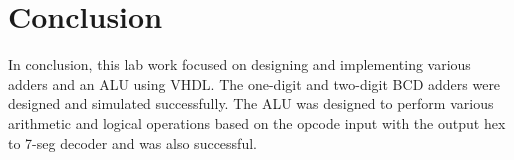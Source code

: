 \documentclass[a4paper, 12pt, english]{article}
\begin{document}
\newpage
\section*{Conclusion}
In conclusion, this lab work focused on designing and implementing various adders and an ALU using VHDL. The one-digit and two-digit BCD adders were designed and simulated successfully. The ALU was designed to perform various arithmetic and logical operations based on the opcode input with the output hex to 7-seg decoder and was also successful.
\end{document}
